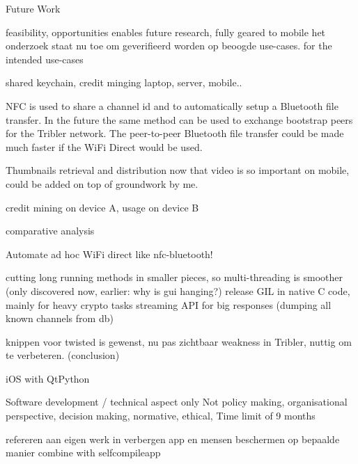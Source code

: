 Future Work



feasibility, opportunities enables future research, fully geared to mobile
het onderzoek staat nu toe om geverifieerd worden op beoogde use-cases.
for the intended use-cases 


shared keychain, credit minging laptop, server, mobile..


NFC is used to share a channel id and to automatically setup a Bluetooth file transfer.
In the future the same method can be used to exchange bootstrap peers for the Tribler network.
The peer-to-peer Bluetooth file transfer could be made much faster if the WiFi Direct would be used.


Thumbnails retrieval and distribution now that video is so important on mobile, could be added on top of groundwork by me.


credit mining on device A, usage on device B


comparative analysis

Automate ad hoc WiFi direct like nfc-bluetooth!

cutting long running methods in smaller pieces, so multi-threading is smoother (only discovered now, earlier: why is gui hanging?)
release GIL in native C code, mainly for heavy crypto tasks
streaming API for big responses (dumping all known channels from db)

knippen voor twisted is gewenst, nu pas zichtbaar weakness in Tribler, nuttig om te verbeteren. (conclusion)


iOS with QtPython


Software development / technical aspect only
Not policy making, organisational perspective, decision making, normative, ethical,
Time limit of 9 months


refereren aan eigen werk in verbergen app en mensen beschermen op bepaalde manier
combine with selfcompileapp
